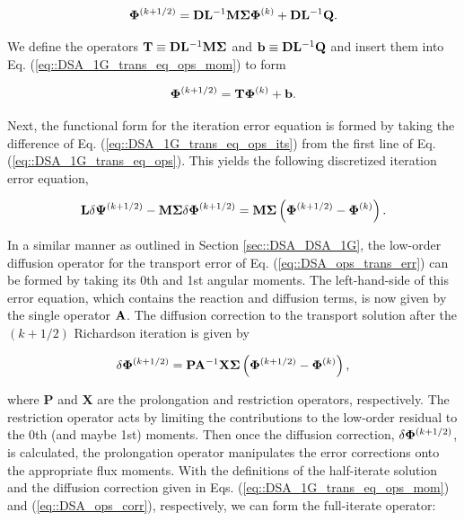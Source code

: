 \begin{equation}
\label{eq::DSA_1G_trans_eq_ops_mom}
 {\bf \Phi}^{(k+1/2)}  =  {\bf D} {\bf L}^{-1} {\bf M} {\bf \Sigma}  {\bf \Phi}^{(k)} +  {\bf D} {\bf L}^{-1}   {\bf Q} .
\end{equation}

\noindent We define the operators ${\bf T} \equiv {\bf D} {\bf L}^{-1} {\bf M} {\bf \Sigma}$ and ${\bf b} \equiv {\bf D} {\bf L}^{-1}   {\bf Q}$ and insert them into Eq. (\ref{eq::DSA_1G_trans_eq_ops_mom}) to form

\begin{equation}
\label{eq::DSA_1G_trans_eq_ops_mom_simple}
 {\bf \Phi}^{(k+1/2)}  = {\bf T}  {\bf \Phi}^{(k)} +  {\bf b} .
\end{equation}

\noindent Next, the functional form for the iteration error equation is formed by taking the difference of Eq. (\ref{eq::DSA_1G_trans_eq_ops_its}) from the first line of Eq. (\ref{eq::DSA_1G_trans_eq_ops}). This yields the following discretized iteration error equation,

\begin{equation}
\label{eq::DSA_ops_trans_err}
{\bf L} \delta {\bf \Psi}^{(k+1/2)} - {\bf M} {\bf \Sigma} \delta {\bf \Phi}^{(k+1/2)}  =   {\bf M} {\bf \Sigma} \left( {\bf \Phi}^{(k+1/2)} - {\bf \Phi}^{(k)}  \right) .
\end{equation}

\noindent In a similar manner as outlined in Section \ref{sec::DSA_DSA_1G}, the low-order diffusion operator for the transport error of Eq. (\ref{eq::DSA_ops_trans_err}) can be formed by taking its 0th and 1st angular moments. The left-hand-side of this error equation, which contains the reaction and diffusion terms, is now given by the single operator ${\bf A}$. The diffusion correction to the transport solution after the $(k+1/2)$ Richardson iteration is given by

\begin{equation}
\label{eq::DSA_ops_corr}
 \delta {\bf \Phi}^{(k+1/2)}  = {\bf P} {\bf A}^{-1} {\bf X} {\bf \Sigma} \left( {\bf \Phi}^{(k+1/2)} - {\bf \Phi}^{(k)}  \right) ,
\end{equation}

\noindent where {\bf P} and {\bf X} are the prolongation and restriction operators, respectively. The restriction operator acts by limiting the contributions to the low-order residual to the 0th (and maybe 1st) moments. Then once the diffusion correction, $\delta {\bf \Phi}^{(k+1/2)}$, is calculated, the prolongation operator manipulates the error corrections onto the appropriate flux moments. With the definitions of the half-iterate solution and the diffusion correction given in Eqs. (\ref{eq::DSA_1G_trans_eq_ops_mom}) and (\ref{eq::DSA_ops_corr}), respectively, we can form the full-iterate operator:


